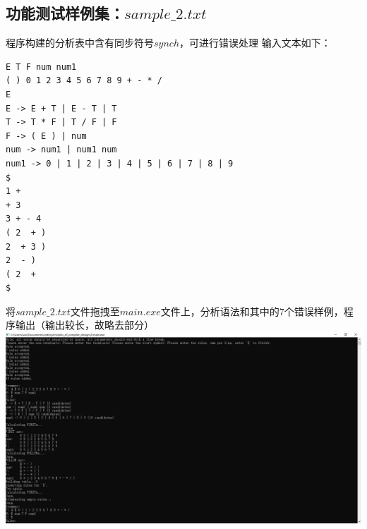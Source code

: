 \documentclass[UTF8]{ctexart}
\begin{document}
\subsection{功能测试样例集：$sample\_2.txt$}
程序构建的分析表中含有同步符号$synch$，可进行错误处理
输入文本如下：
\begin{lstlisting}
E T F num num1
( ) 0 1 2 3 4 5 6 7 8 9 + - * /
E
E -> E + T | E - T | T
T -> T * F | T / F | F
F -> ( E ) | num
num -> num1 | num1 num
num1 -> 0 | 1 | 2 | 3 | 4 | 5 | 6 | 7 | 8 | 9
$
1 + 
+ 3
3 + - 4
( 2  + )
2  + 3 )
2  - )
( 2  + 
$
    \end{lstlisting}
将$sample\_2.txt$文件拖拽至$main.exe$文件上，分析语法和其中的$7$个错误样例，程序输出（输出较长，故略去部分） \\
\includegraphics[width=\textwidth]{sample_2}
\end{document}
